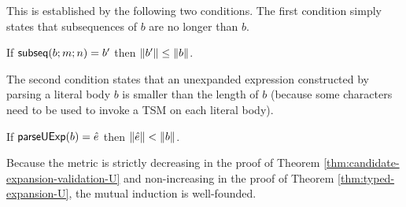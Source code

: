 This is established by the following two conditions. The first condition simply states that subsequences of $b$ are no longer than $b$.
\begin{condition} If $\mathsf{subseq}(b; m; n)=b'$ then $\Vert b' \Vert \leq \Vert b \Vert$. \end{condition}
The second condition states that an unexpanded expression constructed by parsing a literal body $b$ is smaller than the length of $b$ (because some characters need to be used to invoke a TSM on each literal body).
\begin{condition} If $\mathsf{parseUExp}(b)=\hat{e}$ then $\Vert \hat{e} \Vert < \Vert b \Vert$.\end{condition}

Because the metric is strictly decreasing in the proof of Theorem \ref{thm:candidate-expansion-validation-U} and non-increasing in the proof of Theorem \ref{thm:typed-expansion-U}, the mutual induction is well-founded.

